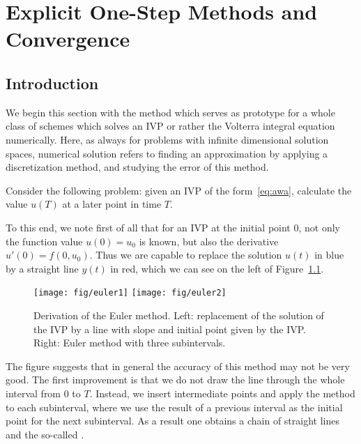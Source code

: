 \chapter{Explicit One-Step Methods and Convergence}

\section{Introduction}
\begin{example}
  We begin this section with the method which serves as prototype for
  a whole class of schemes which solves an IVP or rather the Volterra
  integral equation numerically. Here, as always for problems with
  infinite dimensional solution spaces, numerical solution refers to
  finding an approximation by applying a discretization method, and
  studying the error of this method.
  
  Consider the following problem: given an IVP of the form~\eqref{eq:awa},
  calculate the value $u(T)$ at a later point in time $T$.
  
  To this end, we note first of all that for an IVP at the initial
  point $0$, not only the function value $u(0) = u_0$ is known,
  but also the derivative $u'(0) = f(0, u_0)$. Thus we are capable
  to replace the solution $u(t)$ in blue by a straight line $y(t)$ in
  red, which we can see on the left of Figure~\ref{fig:explicit:Euler}.
  \begin{figure}[tp]
    \centering
    \texttt{[image: fig/euler1]}
    \texttt{[image: fig/euler2]}
    \caption{Derivation of the Euler method. Left: replacement of the
			solution of the IVP by a line with slope and initial point given 
			by the IVP. Right: Euler method with three subintervals.}
    \label{fig:explicit:Euler}
  \end{figure}
  The figure suggests that in general the accuracy of this method may
  not be very good. The first improvement is that we do not draw the
  line through the whole interval from $0$ to $T$.  Instead, we
  insert intermediate points and apply the method to each subinterval,
  where we use the result of a previous interval as the initial point
  for the next subinterval.  As a result one obtains a
  chain of straight lines and the so-called .
\end{example}




